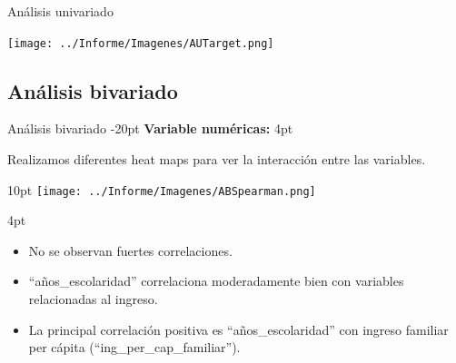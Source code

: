 \documentclass[pdf]{beamer}
\def\vspace{}%
\begin{document}
{\begin{frame}{Análisis univariado}
    \begin{center}
        \texttt{[image: ../Informe/Imagenes/AUTarget.png]}    
    \end{center}

\end{frame}
    
    \subsection{Análisis bivariado}

\begin{frame}{Análisis bivariado}
    \vspace{-20pt}
    \textbf{Variable numéricas:}
    \vspace{4pt}

    Realizamos diferentes heat maps para ver la interacción entre las variables.

    \begin{minipage}{0.46\textwidth}
        \vspace{10pt}
        \texttt{[image: ../Informe/Imagenes/ABSpearman.png]}
    \end{minipage}
    \begin{minipage}{0.46\textwidth}
        \vspace{4pt}
        \begin{itemize}
            \justifying%
            \item No se observan fuertes correlaciones.
            \item ``años\_escolaridad'' correlaciona moderadamente bien con variables relacionadas al ingreso.
            \item La principal correlación positiva es ``años\_escolaridad'' con ingreso familiar per cápita (``ing\_per\_cap\_familiar'').
        \end{itemize}
    \end{minipage}

\end{frame}
 

 
}
\end{document}
